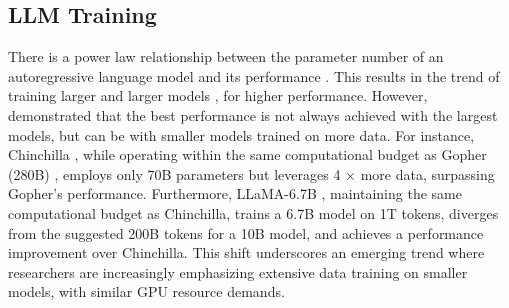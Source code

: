 







\subsection{LLM Training}
There is a power law relationship between the parameter number of an autoregressive language model and its performance \cite{kapscaling,openaiscalinglaw}. This results in the trend of training larger and larger models \cite{GPT3,NLG,LaMDA,OPT,GLM-130B}, for higher performance. However, \cite{trainingcomputeoptimal,LLaMA} demonstrated that the best performance is not always achieved with the largest models, but can be with smaller models trained on more data. For instance, Chinchilla \cite{trainingcomputeoptimal}, while operating within the same computational budget as Gopher (280B) \cite{ScalingLanguageModels}, employs only 70B parameters but leverages 4 $\times$ more data, surpassing Gopher's performance. Furthermore, LLaMA-6.7B \cite{LLaMA}, maintaining the same computational budget as Chinchilla, trains a 6.7B model on 1T tokens, diverges from the suggested 200B tokens for a 10B model, and achieves a performance improvement over Chinchilla. This shift underscores an emerging trend where researchers are increasingly emphasizing extensive data training on smaller models, 
with similar GPU resource demands.


